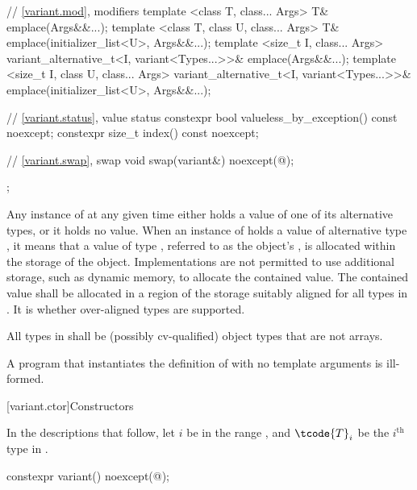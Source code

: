 \begin{codeblock}
{{      // \ref{variant.mod}, modifiers
      template <class T, class... Args>
        T& emplace(Args&&...);
      template <class T, class U, class... Args>
        T& emplace(initializer_list<U>, Args&&...);
      template <size_t I, class... Args>
        variant_alternative_t<I, variant<Types...>>& emplace(Args&&...);
      template <size_t I, class U, class... Args>
        variant_alternative_t<I, variant<Types...>>& emplace(initializer_list<U>, Args&&...);

      // \ref{variant.status}, value status
      constexpr bool valueless_by_exception() const noexcept;
      constexpr size_t index() const noexcept;

      // \ref{variant.swap}, swap
      void swap(variant&) noexcept(@\seebelow@);
    };
}
\end{codeblock}

\pnum
Any instance of  at any given time either holds a value
of one of its alternative types, or it holds no value.
When an instance of  holds a value of alternative type ,
it means that a value of type , referred to as the 
object's , is allocated within the storage of the
 object.
Implementations are not permitted to use additional storage, such as dynamic
memory, to allocate the contained value.
The contained value shall be allocated in a region of the 
storage suitably aligned for all types in .
It is 
whether over-aligned types are supported.

\pnum
All types in  shall be (possibly cv-qualified)
object types that are not arrays.

\pnum
A program that instantiates the definition of  with
no template arguments is ill-formed.

[variant.ctor]{Constructors}

\pnum
In the descriptions that follow, let $i$ be in the range ,
and $\tcode{T}_i$ be the $i^\text{th}$ type in .

%
\begin{itemdecl}
constexpr variant() noexcept(@\seebelow@);
\end{itemdecl}

